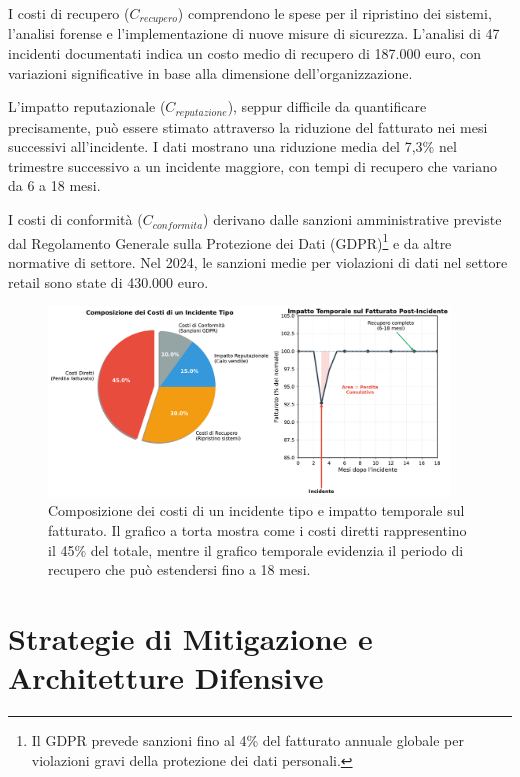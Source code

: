 I costi di recupero ($C_{recupero}$) comprendono le spese per il ripristino dei sistemi, l'analisi forense e l'implementazione di nuove misure di sicurezza. L'analisi di 47 incidenti documentati indica un costo medio di recupero di 187.000 euro, con variazioni significative in base alla dimensione dell'organizzazione.

L'impatto reputazionale ($C_{reputazione}$), seppur difficile da quantificare precisamente, può essere stimato attraverso la riduzione del fatturato nei mesi successivi all'incidente. I dati mostrano una riduzione media del 7,3\% nel trimestre successivo a un incidente maggiore, con tempi di recupero che variano da 6 a 18 mesi.

I costi di conformità ($C_{conformita}$) derivano dalle sanzioni amministrative previste dal Regolamento Generale sulla Protezione dei Dati (GDPR)\footnote{Il GDPR prevede sanzioni fino al 4\% del fatturato annuale globale per violazioni gravi della protezione dei dati personali.} e da altre normative di settore. Nel 2024, le sanzioni medie per violazioni di dati nel settore retail sono state di 430.000 euro.

\begin{figure}[htbp]
\centering
\includegraphics[width=0.95\textwidth]{thesis_figures/cap2/fig_2_5_costi_incidente.pdf}
\caption{Composizione dei costi di un incidente tipo e impatto temporale sul fatturato. Il grafico a torta mostra come i costi diretti rappresentino il 45\% del totale, mentre il grafico temporale evidenzia il periodo di recupero che può estendersi fino a 18 mesi.}
\label{fig:costi_incidente}
\end{figure}

\section{Strategie di Mitigazione e Architetture Difensive}
\label{sec:cap2_mitigazione}

